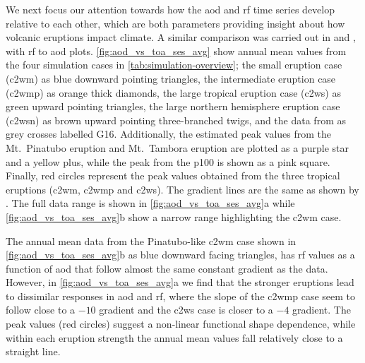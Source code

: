 \documentclass[twocol]{ametsocV6.1}
\begin{document}
We next focus our attention towards how the \gls{aod} and \gls{rf} time series develop
relative to each other, which are both parameters providing insight about how volcanic
eruptions impact climate. A similar comparison was carried out in \citet[][their Fig.\
  4]{gregory2016} and \citet[][their Fig.\ 1]{marshall2020}, with \gls{rf} to \gls{aod}
plots. \ref{fig:aod_vs_toa_ses_avg} show annual mean values from the four simulation
cases in \ref{tab:simulation-overview}; the small eruption case (\gls{c2wm}) as blue
downward pointing triangles, the intermediate eruption case (\gls{c2wmp}) as orange
thick diamonds, the large tropical eruption case (\gls{c2ws}) as green upward pointing
triangles, the large northern hemisphere eruption case (\gls{c2wsn}) as brown upward
pointing three-branched twigs, and the data from \citet[][Fig.\ 4, black crosses from
  HadCM3 sstPiHistVol]{gregory2016} as grey crosses labelled G16. Additionally, the
estimated peak values from the Mt.\ Pinatubo eruption and Mt.\ Tambora eruption are
plotted as a purple star and a yellow plus, while the peak from the \gls{p100} is shown
as a pink square. Finally, red circles represent the peak values obtained from the three
tropical eruptions (\gls{c2wm}, \gls{c2wmp} and \gls{c2ws}). The gradient lines are the
same as shown by \citet{gregory2016}. The full data range is shown in
\ref{fig:aod_vs_toa_ses_avg}a while \ref{fig:aod_vs_toa_ses_avg}b show a narrow range
highlighting the \gls{c2wm} case.

The annual mean data from the Pinatubo-like \gls{c2wm} case shown in
\ref{fig:aod_vs_toa_ses_avg}b as blue downward facing triangles, has \gls{rf} values as a
function of \gls{aod} that follow almost the same constant gradient as the
\citet{gregory2016} data. However, in \ref{fig:aod_vs_toa_ses_avg}a we find that the
stronger eruptions lead to dissimilar responses in \gls{aod} and \gls{rf}, where the
slope of the \gls{c2wmp} case seem to follow close to a \(-10\) gradient and the
\gls{c2ws} case is closer to a \(-4\) gradient. The peak values (red circles) suggest a
non-linear functional shape dependence, while within each eruption strength the annual
mean values fall relatively close to a straight line.
\end{document}
